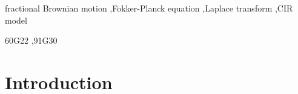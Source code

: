 \documentclass[preprint, 12pt]{elsarticle}
\numberwithin{equation}{section}
\theoremstyle{plain}
\theoremstyle{remark}
\begin{document}
\begin{frontmatter}
\begin{abstract}
\end{abstract}

\begin{keyword}
fractional Brownian motion \sep Fokker-Planck equation \sep Laplace transform \sep CIR model

\MSC[2010] 60G22 \sep 91G30

\end{keyword}

\end{frontmatter}
\pagestyle{fancy}
 \chead{} \rhead{}
\renewcommand{\headrulewidth}{0.4pt}


\section{Introduction}\label{intro}
\end{document}
